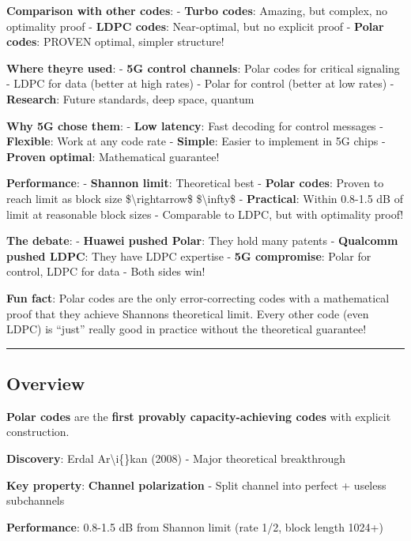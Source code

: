 \textbf{Comparison with other codes}: - \textbf{Turbo codes}: Amazing,
but complex, no optimality proof - \textbf{LDPC codes}: Near-optimal,
but no explicit proof - \textbf{Polar codes}: PROVEN optimal, simpler
structure!

\textbf{Where they\textquotesingle re used}: - \textbf{5G control
channels}: Polar codes for critical signaling - LDPC for data (better at
high rates) - Polar for control (better at low rates) -
\textbf{Research}: Future standards, deep space, quantum

\textbf{Why 5G chose them}: - \textbf{Low latency}: Fast decoding for
control messages - \textbf{Flexible}: Work at any code rate -
\textbf{Simple}: Easier to implement in 5G chips - \textbf{Proven
optimal}: Mathematical guarantee!

\textbf{Performance}: - \textbf{Shannon limit}: Theoretical best -
\textbf{Polar codes}: Proven to reach limit as block size
\$\textbackslash rightarrow\$ \$\textbackslash infty\$ -
\textbf{Practical}: Within 0.8-1.5 dB of limit at reasonable block sizes
- Comparable to LDPC, but with optimality proof!

\textbf{The debate}: - \textbf{Huawei pushed Polar}: They hold many
patents - \textbf{Qualcomm pushed LDPC}: They have LDPC expertise -
\textbf{5G compromise}: Polar for control, LDPC for data - Both sides
win!

\textbf{Fun fact}: Polar codes are the only error-correcting codes with
a mathematical proof that they achieve Shannon\textquotesingle s
theoretical limit. Every other code (even LDPC) is ``just'' really good
in practice without the theoretical guarantee!

\begin{center}\rule{0.5\linewidth}{0.5pt}\end{center}

\subsection{Overview}\label{overview}

\textbf{Polar codes} are the \textbf{first provably capacity-achieving
codes} with explicit construction.

\textbf{Discovery}: Erdal Ar\textbackslash i\{\}kan (2008) - Major
theoretical breakthrough

\textbf{Key property}: \textbf{Channel polarization} - Split channel
into perfect + useless subchannels

\textbf{Performance}: 0.8-1.5 dB from Shannon limit (rate 1/2, block
length 1024+)

